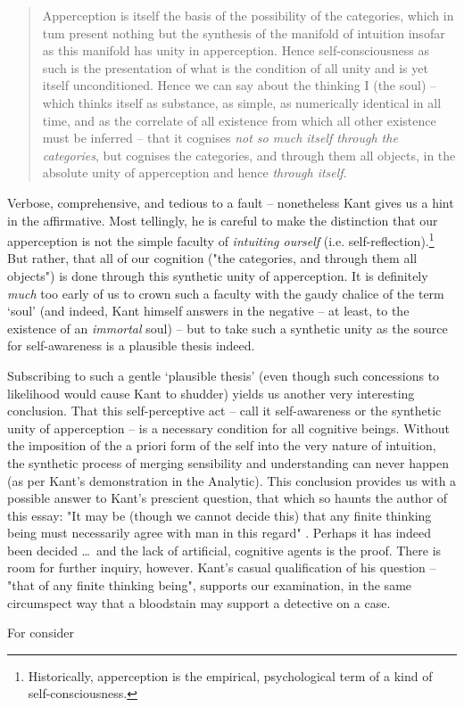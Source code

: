 \begin{quote}
  Apperception is itself the basis of the possibility of the categories, which in tum present nothing but the synthesis of the manifold of intuition insofar as this manifold has unity in apperception. Hence self-consciousness as such is the presentation of what is the condition of all unity and is yet itself unconditioned. Hence we can say about the thinking I (the soul) -- which thinks itself as substance, as simple, as numerically identical in all time, and as the correlate of all existence from which all other existence must be inferred -- that it cognises \emph{not so much itself through the categories}, but cognises the categories, and through them all objects, in the absolute unity of apperception and hence \emph{through itself}.

  \autocite[A399]{hackett}
\end{quote}

\noindent
Verbose, comprehensive, and tedious to a fault -- nonetheless Kant gives us a hint in the affirmative. Most tellingly, he is careful to make the distinction that our apperception is not the simple faculty of \emph{intuiting ourself} (i.e. self-reflection).\footnote{Historically, apperception is the empirical, psychological term of a kind of self-consciousness.} But rather, that all of our cognition ("the categories, and through them all objects") is done through this synthetic unity of apperception. It is definitely \emph{much} too early of us to crown such a faculty with the gaudy chalice of the term `soul' (and indeed, Kant himself answers in the negative -- at least, to the existence of an \emph{immortal} soul) -- but to take such a synthetic unity as the source for self-awareness is a plausible thesis indeed.

Subscribing to such a gentle `plausible thesis' (even though such concessions to likelihood would cause Kant to shudder) yields us another very interesting conclusion. That this self-perceptive act -- call it self-awareness or the synthetic unity of apperception -- is a necessary condition for all cognitive beings. Without the imposition of the a priori form of the self into the very nature of intuition, the synthetic process of merging sensibility and understanding can never happen (as per Kant's demonstration in the Analytic). This conclusion provides us with a possible answer to Kant's prescient question, that which so haunts the author of this essay: "It may be (though we cannot decide this) that any finite thinking being must necessarily agree with man in this regard" \autocite[B72]{hackett}. Perhaps it has indeed been decided \ldots\ and the lack of artificial, cognitive agents is the proof. There is room for further inquiry, however. Kant's casual qualification of his question -- "that of any finite thinking being", supports our examination, in the same circumspect way that a bloodstain may support a detective on a case.

\noindent
For consider



